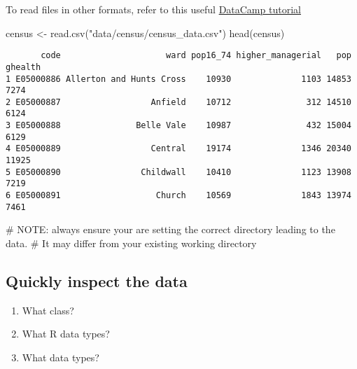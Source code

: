\documentclass[
  letterpaper,
  krantz2]{style/krantz}
\newenvironment{Shaded}{\begin{snugshade}}{\end{snugshade}}
\newcommand{\AlertTok}[1]{\textcolor[rgb]{0.68,0.00,0.00}{#1}}
\newcommand{\CommentTok}[1]{\textcolor[rgb]{0.37,0.37,0.37}{#1}}
\newcommand{\FunctionTok}[1]{\textcolor[rgb]{0.28,0.35,0.67}{#1}}
\newcommand{\NormalTok}[1]{\textcolor[rgb]{0.00,0.23,0.31}{#1}}
\newcommand{\OtherTok}[1]{\textcolor[rgb]{0.00,0.23,0.31}{#1}}
\newcommand{\StringTok}[1]{\textcolor[rgb]{0.13,0.47,0.30}{#1}}
\begin{document}
To read files in other formats, refer to this useful
\href{https://www.datacamp.com/community/tutorials/r-data-import-tutorial?utm_source=adwords_ppc\&utm_campaignid=1655852085\&utm_adgroupid=61045434382\&utm_device=c\&utm_keyword=\%2Bread\%20\%2Bdata\%20\%2Br\&utm_matchtype=b\&utm_network=g\&utm_adpostion=1t1\&utm_creative=318880582308\&utm_targetid=kwd-309793905111\&utm_loc_interest_ms=\&utm_loc_physical_ms=9046551\&gclid=CjwKCAiA3uDwBRBFEiwA1VsajJO0QK0Jg7VipIt8_t82qQrnUliI0syAlh8CIxnE76Rb0kh3FbiehxoCzCgQAvD_BwE\#csv}{DataCamp
tutorial}

\begin{Shaded}
\begin{Highlighting}[]
\NormalTok{census }\OtherTok{\textless{}{-}} \FunctionTok{read.csv}\NormalTok{(}\StringTok{"data/census/census\_data.csv"}\NormalTok{)}
\FunctionTok{head}\NormalTok{(census)}
\end{Highlighting}
\end{Shaded}

\begin{verbatim}
       code                     ward pop16_74 higher_managerial   pop ghealth
1 E05000886 Allerton and Hunts Cross    10930              1103 14853    7274
2 E05000887                  Anfield    10712               312 14510    6124
3 E05000888               Belle Vale    10987               432 15004    6129
4 E05000889                  Central    19174              1346 20340   11925
5 E05000890                Childwall    10410              1123 13908    7219
6 E05000891                   Church    10569              1843 13974    7461
\end{verbatim}

\begin{Shaded}
\begin{Highlighting}[]
\CommentTok{\# }\AlertTok{NOTE}\CommentTok{: always ensure your are setting the correct directory leading to the data. }
\CommentTok{\# It may differ from your existing working directory}
\end{Highlighting}
\end{Shaded}

\hypertarget{quickly-inspect-the-data}{%
\subsection{Quickly inspect the data}\label{quickly-inspect-the-data}}

\begin{enumerate}
\def\labelenumi{\arabic{enumi}.}
\item
  What class?
\item
  What R data types?
\item
  What data types?
\end{enumerate}
\end{document}
